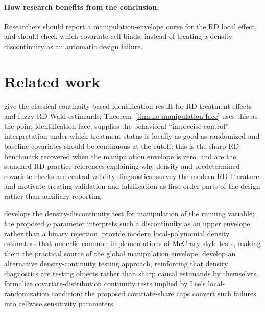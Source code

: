 \documentclass[11pt]{article}
\theoremstyle{definition}
\theoremstyle{plain}
\theoremstyle{remark}
\begin{document}
\paragraph{How research benefits from the conclusion.}
Researchers should report a manipulation-envelope curve for the RD local effect, and should
check which covariate cell binds, instead of treating a density discontinuity as an automatic
design failure.

\section{Related work}
\citet{HahnToddVanDerKlaauw2001} give the classical continuity-based identification result
for RD treatment effects and fuzzy RD Wald estimands; Theorem~\ref{thm:no-manipulation-face}
uses this as the point-identification face.  \citet{Lee2008} supplies the behavioral
``imprecise control'' interpretation under which treatment status is locally as good as
randomized and baseline covariates should be continuous at the cutoff; this is the sharp
RD benchmark recovered when the manipulation envelope is zero.  \citet{ImbensLemieux2008}
and \citet{LeeLemieux2010} are the standard RD practice references explaining why density
and predetermined-covariate checks are central validity diagnostics.  \citet{CattaneoTitiunik2022}
survey the modern RD literature and motivate treating validation and falsification as
first-order parts of the design rather than auxiliary reporting.

\citet{McCrary2008} develops the density-discontinuity test for manipulation of the running
variable; the proposed \(\bar\rho\) parameter interprets such a discontinuity as an upper
envelope rather than a binary rejection.  \citet{CattaneoJanssonMa2020} provide modern
local-polynomial density estimators that underlie common implementations of McCrary-style
tests, making them the practical source of the global manipulation envelope.  \citet{BugniCanay2021}
develop an alternative density-continuity testing approach, reinforcing that density
diagnostics are testing objects rather than sharp causal estimands by themselves.
\citet{CanayKamat2018} formalize covariate-distribution continuity tests implied by Lee's
local-randomization condition; the proposed covariate-share caps convert such failures into
cellwise sensitivity parameters.
\end{document}
